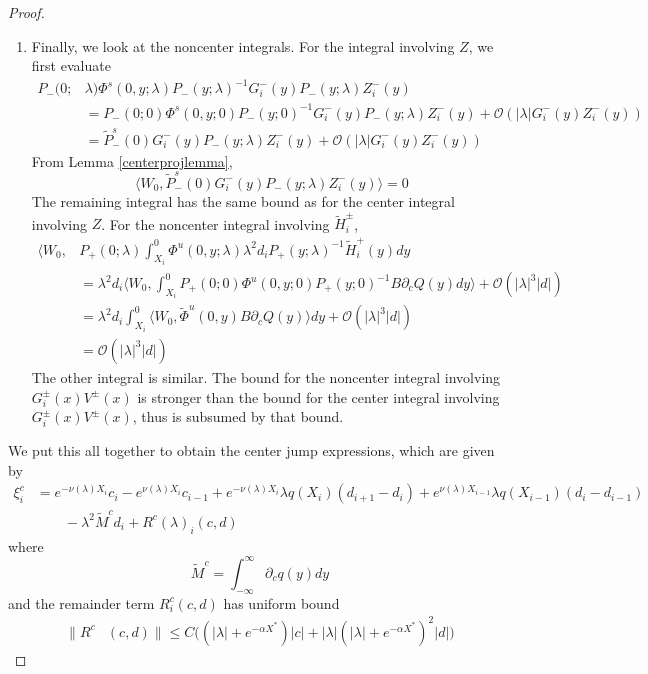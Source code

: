 \documentclass[thesis.tex]{subfiles}
\begin{document}
\begin{lemma}
\begin{proof}
\begin{enumerate}
\item Finally, we look at the noncenter integrals. For the integral involving $Z$, we first evaluate 
\begin{align*}
P_-(0; &\lambda) \Phi^s(0, y; \lambda) P_-(y; \lambda)^{-1} G_i^-(y) P_-(y; \lambda)Z_i^-(y) \\
&= P_-(0; 0) \Phi^s(0, y; 0) P_-(y; 0)^{-1}G_i^-(y) P_-(y; \lambda)Z_i^-(y) + \mathcal{O}(|\lambda| G_i^-(y) Z_i^-(y)) \\
&= \tilde{P}_-^s(0)G_i^-(y) P_-(y; \lambda)Z_i^-(y) + \mathcal{O}(|\lambda| G_i^-(y) Z_i^-(y))
\end{align*}
From Lemma \ref{centerprojlemma},
\[
\langle W_0, \tilde{P}_-^s(0)G_i^-(y) P_-(y; \lambda)Z_i^-(y) \rangle = 0
\]
The remaining integral has the same bound as for the center integral involving $Z$. For the noncenter integral involving $\tilde{H}_i^\pm$, 
\begin{align*}
\langle W_0, 
&P_+(0; \lambda) \int_{X_i}^0 \Phi^u(0, y; \lambda) \lambda^2 d_i P_+(y; \lambda)^{-1} \tilde{H}_i^+(y) dy\\
&= \lambda^2 d_i \langle W_0, \int_{X_i}^0 P_+(0; 0) \Phi^u(0, y; 0) P_+(y; 0)^{-1} B \partial_c Q(y) dy \rangle + \mathcal{O}(|\lambda|^3 |d| ) \\
&= \lambda^2 d_i \int_{X_i}^0 \langle W_0, \tilde{\Phi}^u(0, y)  B \partial_c Q(y) \rangle dy + \mathcal{O}(|\lambda|^3 |d| ) \\
&= \mathcal{O}(|\lambda|^3 |d| ) 
\end{align*}
The other integral is similar. The bound for the noncenter integral involving $G_i^\pm(x) V^\pm(x)$ is stronger than the bound for the center integral involving $G_i^\pm(x) V^\pm(x)$, thus is subsumed by that bound.
\end{enumerate}

We put this all together to obtain the center jump expressions, which are given by
\begin{align*}
\xi^c_i &= e^{-\nu(\lambda)X_i} c_i - e^{\nu(\lambda)X_i} c_{i-1} + e^{-\nu(\lambda)X_i} \lambda q(X_i) (d_{i+1} - d_i ) + e^{\nu(\lambda)X_{i-1}} \lambda q(X_{i-1}) (d_i - d_{i-1} ) \\
&\qquad- \lambda^2 \tilde{M}^c d_i + R^c(\lambda)_i(c, d)
\end{align*}
where
\[
\tilde{M}^c = \int_{-\infty}^\infty \partial_c q(y) dy
\]
and the remainder term $R^c_i(c, d)$ has uniform bound
\begin{equation}\label{centerR}
\begin{aligned}
\|R^c&(c, d)\| \leq C \Big( (|\lambda| + e^{-\alpha X^*})|c| + |\lambda| (|\lambda| + e^{-\alpha X^*})^2 |d| \Big)
\end{aligned}
\end{equation}


\end{proof}
\end{lemma}
\end{document}

